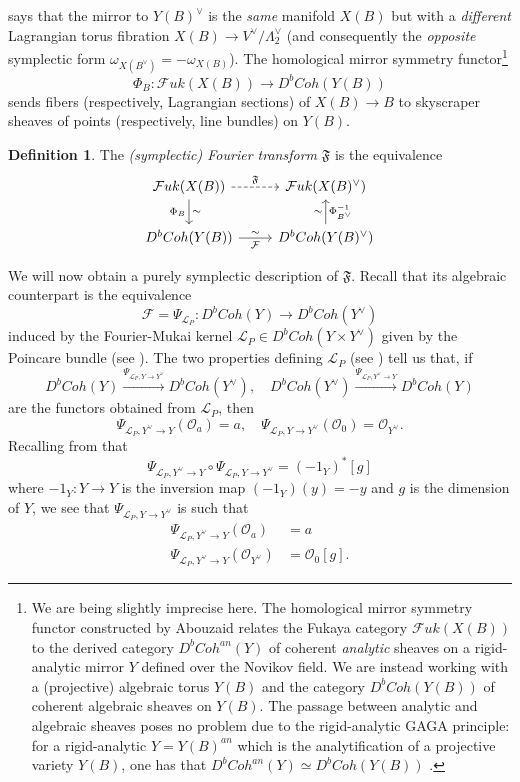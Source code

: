 \documentclass[10pt]{amsart}
\theoremstyle{definition}
\newtheorem{definition}[thm]{Definition}
\theoremstyle{remark}
\def\inv{^{-1}}
\newcommand{\mcal}{\mathcal}
\def\x{\times}
\newcommand{\xra}[1]{\xrightarrow{#1}}
\begin{document}
 says that the mirror to $Y(B)^\vee$ is the \emph{same} manifold $X(B)$ but with  a \emph{different} Lagrangian torus fibration $X(B) \to V^\vee/\Lambda_2^\vee$ (and consequently the \emph{opposite} symplectic form $\omega_{X(B^\vee)} = -\omega_{X(B)}$).
The homological mirror symmetry functor\footnote{We are being slightly imprecise here. The homological mirror symmetry functor constructed by Abouzaid \cite{abouzaid2014family,abouzaid2017family,abouzaid2021homological} relates the Fukaya category $\mcal Fuk(X(B))$ to the derived category $D^bCoh^{an}(Y)$ of coherent \emph{analytic} sheaves on a rigid-analytic mirror $Y$ defined over the Novikov field. We are instead working with a (projective) algebraic torus $Y(B)$ and the category $D^bCoh(Y(B))$ of coherent algebraic sheaves on $Y(B)$. The passage between analytic and algebraic sheaves poses no problem due to the rigid-analytic GAGA principle: for a rigid-analytic $Y = Y(B)^{an}$ which is the analytification of a projective variety $Y(B)$, one has that $D^bCoh^{an}(Y) \simeq D^bCoh(Y(B))$ \cite{fresnel2012rigid}.}
$$
\Phi_B: \mcal Fuk(X(B)) \to D^bCoh(Y(B))
$$
sends fibers (respectively, Lagrangian sections) of $X(B) \to B$ to skyscraper sheaves of points (respectively, line bundles) on $Y(B)$.
\begin{definition}\label{defn:symplecticfourier}
    The \emph{(symplectic) Fourier transform} $\mathfrak F$ is the equivalence 
$$
    \begin{tikzcd}
        \mcal Fuk(X(B)) \arrow[r,dashed,"\mathfrak F"] \arrow[d,"\sim","\Phi_B"'] & \mcal Fuk(X(B)^\vee) \\
        D^bCoh(Y(B)) \arrow[r,"\sim","\mcal F"'] & D^bCoh(Y(B)^\vee) \arrow[u,"\sim","\Phi_{B^\vee}\inv"']
    \end{tikzcd}
    $$
\end{definition}

We will now obtain a purely symplectic description of $\mathfrak F$.
Recall that its algebraic counterpart  is the equivalence 
$$
\mcal F = \Psi_{\mcal L_P}: D^bCoh(Y) \to D^bCoh(Y^\vee)
$$
induced by the Fourier-Mukai kernel $\mathcal L_P \in D^bCoh(Y \x Y^\vee)$ given by the Poincare bundle (see ).
The two properties defining $\mathcal L_P$ (see ) tell us that, if
$$
    D^bCoh(Y) \xra{\Psi_{\mcal L_P, Y \to Y^\vee}} D^bCoh(Y^\vee), \quad D^bCoh(Y^\vee) \xra{\Psi_{\mcal L_P, Y^\vee \to Y}} D^bCoh(Y)
$$
are the functors obtained from $\mcal L_P$, then
$$
    \Psi_{\mcal L_P, Y^\vee \to Y}(\mcal O_a) = a, \quad \Psi_{\mcal L_P, Y \to Y^\vee}(\mcal O_0) = \mcal O_{Y^\vee}.
$$
Recalling from \cite{mukai1981duality} that 
$$
\Psi_{\mcal L_P, Y^\vee \to Y} \circ \Psi_{\mcal L_P, Y \to Y^\vee}  = (-1_Y)^*[g]
$$
where $-1_Y:Y \to Y $ is the inversion map $(-1_Y)(y) = -y$ and $g$ is the dimension of $Y$, we see that $\Psi_{\mcal L_P, Y \to Y^\vee}$ is such that 
\begin{align}
        \Psi_{\mcal L_P, Y^\vee \to Y}(\mcal O_a) &= a \label{eq:properties_FM_sky}\\
        \Psi_{\mcal L_P, Y^\vee \to Y}(\mcal O_{Y^\vee}) &= \mcal O_0[g] \label{eq:properties_FM_str}.
\end{align}
\end{document}
